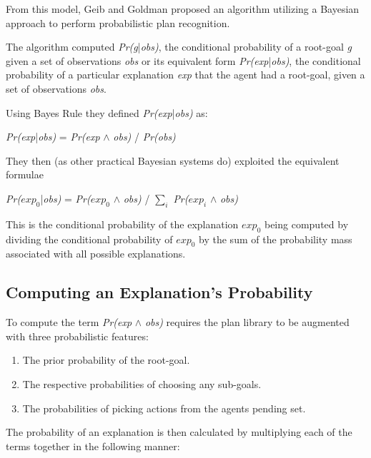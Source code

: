 \documentclass[parskip]{cs4rep}
\begin{document}
From this model, Geib and Goldman proposed an algorithm utilizing a Bayesian approach to perform probabilistic plan recognition. 

The algorithm computed \textit{Pr(g}|\textit{obs)}, the conditional probability of a root-goal \textit{g} given a set of observations \textit{obs} or its equivalent form \textit{Pr(exp}|\textit{obs)}, the conditional probability of a particular explanation \textit{exp} that the agent had a root-goal, given a set of observations \textit{obs}.

Using Bayes Rule they defined \textit{Pr(exp}|\textit{obs)} as:\newline

\centerline{
\textit{Pr(exp}|\textit{obs)} = \textit{Pr(exp} $\wedge$ \textit{obs)} / \textit{Pr(obs)}
}

They then (as other practical Bayesian systems do) exploited the equivalent formulae\newline

\centerline{
\textit{Pr($exp_0$}|\textit{obs)} = \textit{Pr($exp_0$} $\wedge$ \textit{obs)} / $\displaystyle\sum\nolimits_{i}$ \textit{Pr($exp_i$} $\wedge$ \textit{obs)}
}

This is the conditional probability of the explanation $exp_0$ being computed by dividing the conditional probability of $exp_0$  by the sum of the probability mass associated with all possible explanations.

\subsection{Computing an Explanation's Probability}

To compute the term \textit{Pr(exp} $\wedge$ \textit{obs)} requires the plan library to be augmented with three probabilistic features:\newline

\begin{enumerate}
\item
The prior probability of the root-goal.
\item
The respective probabilities of choosing any sub-goals.
\item
The probabilities of picking actions from the agents pending set.\newline
\end{enumerate}

The probability of an explanation is then calculated by multiplying each of the terms together in the following manner: \newline
\end{document}
